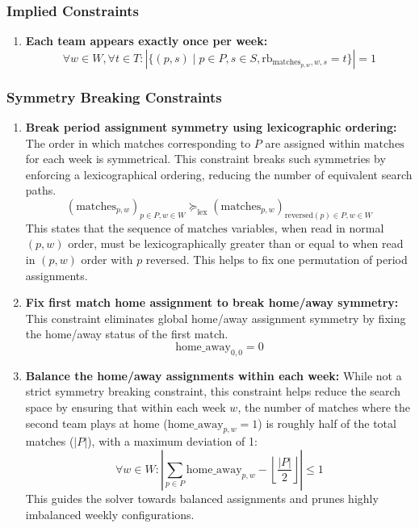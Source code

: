 \documentclass{article}
\begin{document}
\subsubsection{Implied Constraints}

\begin{enumerate}
    \item \textbf{Each team appears exactly once per week:}
    \[ \forall w \in W, \forall t \in T : \left| \{ (p, s) \mid p \in P, s \in S, \text{rb}_{\text{matches}_{p, w}, w, s} = t \} \right| = 1 \]
\end{enumerate}

\subsubsection{Symmetry Breaking Constraints}

\begin{enumerate}
    \item \textbf{Break period assignment symmetry using lexicographic ordering:} The order in which matches corresponding to $P$ are assigned within $\text{matches}$ for each week is symmetrical. This constraint breaks such symmetries by enforcing a lexicographical ordering, reducing the number of equivalent search paths.
    \[ (\text{matches}_{p, w})_{p \in P, w \in W} \succeq_{\text{lex}} (\text{matches}_{p, w})_{\text{reversed}(p) \in P, w \in W} \]
    This states that the sequence of $\text{matches}$ variables, when read in normal $(p,w)$ order, must be lexicographically greater than or equal to when read in $(p,w)$ order with $p$ reversed. This helps to fix one permutation of period assignments.

    \item \textbf{Fix first match home assignment to break home/away symmetry:} This constraint eliminates global home/away assignment symmetry by fixing the home/away status of the first match.
    \[ \text{home\_away}_{0, 0} = 0 \]

\item \textbf{Balance the home/away assignments within each week:} While not a strict symmetry breaking constraint, this constraint helps reduce the search space by ensuring that within each week $w$, the number of matches where the second team plays at home ($\text{home\_away}_{p, w}=1$) is roughly half of the total matches ($|P|$), with a maximum deviation of 1:
\[ \forall w \in W : \left| \sum_{p \in P} \text{home\_away}_{p, w} - \left\lfloor \frac{|P|}{2} \right\rfloor \right| \leq 1 \]
This guides the solver towards balanced assignments and prunes highly imbalanced weekly configurations.

\end{enumerate}
\end{document}
